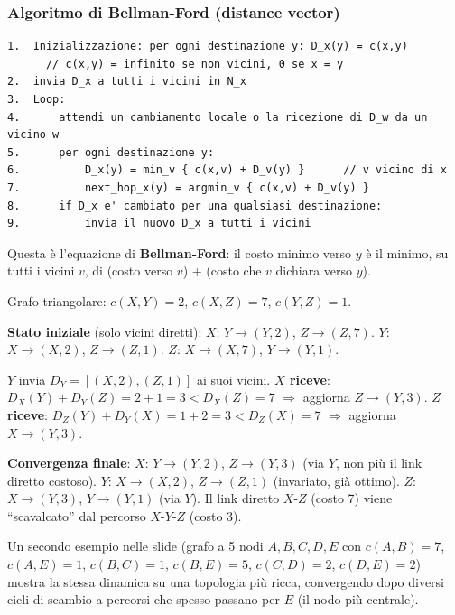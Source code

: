 \documentclass[12pt, a4paper]{article}
\begin{document}
\subsubsection{Algoritmo di Bellman-Ford (distance vector)}

\begin{tcolorbox}[colback=lightergray!10, colframe=tocsec, title=\textbf{Pseudocodice (nodo $x$)}]
\begin{verbatim}
1.  Inizializzazione: per ogni destinazione y: D_x(y) = c(x,y)
      // c(x,y) = infinito se non vicini, 0 se x = y
2.  invia D_x a tutti i vicini in N_x
3.  Loop:
4.      attendi un cambiamento locale o la ricezione di D_w da un vicino w
5.      per ogni destinazione y:
6.          D_x(y) = min_v { c(x,v) + D_v(y) }      // v vicino di x
7.          next_hop_x(y) = argmin_v { c(x,v) + D_v(y) }
8.      if D_x e' cambiato per una qualsiasi destinazione:
9.          invia il nuovo D_x a tutti i vicini
\end{verbatim}
Questa è l'equazione di \textbf{Bellman-Ford}: il costo minimo verso $y$ è il minimo, su tutti i vicini $v$, di (costo verso $v$) + (costo che $v$ dichiara verso $y$).
\end{tcolorbox}

\begin{tcolorbox}[colback=orange!5, colframe=orange!70!black, title=\textbf{Esempio completo -- tre nodi}]
Grafo triangolare: $c(X,Y){=}2$, $c(X,Z){=}7$, $c(Y,Z){=}1$.

\textbf{Stato iniziale} (solo vicini diretti): $X$: $Y{\to}(Y,2)$, $Z{\to}(Z,7)$. \phantom{x} $Y$: $X{\to}(X,2)$, $Z{\to}(Z,1)$. \phantom{x} $Z$: $X{\to}(X,7)$, $Y{\to}(Y,1)$.

$Y$ invia $D_Y=[(X,2),(Z,1)]$ ai suoi vicini. \textbf{$X$ riceve}: $D_X(Y)+D_Y(Z) = 2+1=3 < D_X(Z)=7$ $\Rightarrow$ aggiorna $Z{\to}(Y,3)$. \textbf{$Z$ riceve}: $D_Z(Y)+D_Y(X)=1+2=3<D_Z(X)=7$ $\Rightarrow$ aggiorna $X{\to}(Y,3)$.

\textbf{Convergenza finale}: $X$: $Y{\to}(Y,2)$, $Z{\to}(Y,3)$ (via $Y$, non più il link diretto costoso). $Y$: $X{\to}(X,2)$, $Z{\to}(Z,1)$ (invariato, già ottimo). $Z$: $X{\to}(Y,3)$, $Y{\to}(Y,1)$ (via $Y$). Il link diretto $X$-$Z$ (costo 7) viene ``scavalcato'' dal percorso $X$-$Y$-$Z$ (costo 3).
\end{tcolorbox}

Un secondo esempio nelle slide (grafo a 5 nodi $A,B,C,D,E$ con $c(A,B){=}7$, $c(A,E){=}1$, $c(B,C){=}1$, $c(B,E){=}5$, $c(C,D){=}2$, $c(D,E){=}2$) mostra la stessa dinamica su una topologia più ricca, convergendo dopo diversi cicli di scambio a percorsi che spesso passano per $E$ (il nodo più centrale).
\end{document}
